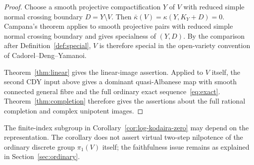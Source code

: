 \begin{proof}
Choose a smooth projective compactification $Y$ of $V$ with reduced
simple normal crossing boundary $D=Y\setminus V$. Then
$\bar\kappa(V)=\kappa(Y,K_Y+D)=0$. Campana's theorem
\cite[arXiv version, Theorem 6.7 and Corollary 4.11]{Campana2011}
applies to smooth projective pairs with reduced simple normal crossing
boundary and gives
specialness of $(Y,D)$. By the comparison after
Definition~\ref{def:special}, $V$ is therefore special in the
open-variety convention of Cadorel--Deng--Yamanoi.

Theorem~\ref{thm:linear} gives the linear-image assertion. Applied to
$V$ itself, the second CDY input above gives a dominant quasi-Albanese
map with smooth connected general fibre and the full ordinary exact
sequence~\eqref{eq:exact}. Theorem~\ref{thm:completion} therefore gives
the assertions about the full rational completion and complex unipotent
images.
\end{proof}

The finite-index subgroup in Corollary~\ref{cor:log-kodaira-zero} may
depend on the representation. The corollary does not assert virtual
two-step nilpotence of the ordinary discrete group $\pi_1(V)$ itself;
the faithfulness issue remains as explained in Section~\ref{sec:ordinary}.
